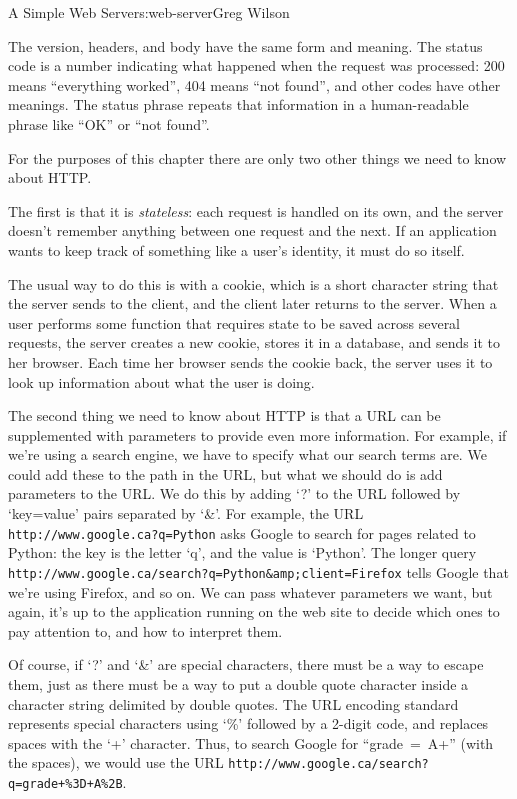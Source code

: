 \begin{aosachapter}{A Simple Web Server}{s:web-server}{Greg Wilson}

The version, headers, and body have the same form and meaning. The
status code is a number indicating what happened when the request was
processed: 200 means ``everything worked'', 404 means ``not found'', and
other codes have other meanings. The status phrase repeats that
information in a human-readable phrase like ``OK'' or ``not found''.

For the purposes of this chapter there are only two other things we need
to know about HTTP.

The first is that it is \emph{stateless}: each request is handled on its
own, and the server doesn't remember anything between one request and
the next. If an application wants to keep track of something like a
user's identity, it must do so itself.

The usual way to do this is with a cookie, which is a short character
string that the server sends to the client, and the client later returns
to the server. When a user performs some function that requires state to
be saved across several requests, the server creates a new cookie,
stores it in a database, and sends it to her browser. Each time her
browser sends the cookie back, the server uses it to look up information
about what the user is doing.

The second thing we need to know about HTTP is that a URL can be
supplemented with parameters to provide even more information. For
example, if we're using a search engine, we have to specify what our
search terms are. We could add these to the path in the URL, but what we
should do is add parameters to the URL. We do this by adding `?' to the
URL followed by `key=value' pairs separated by `\&'. For example, the
URL \texttt{http://www.google.ca?q=Python} asks Google to search for
pages related to Python: the key is the letter `q', and the value is
`Python'. The longer query
\texttt{http://www.google.ca/search?q=Python\&amp;client=Firefox} tells
Google that we're using Firefox, and so on. We can pass whatever
parameters we want, but again, it's up to the application running on the
web site to decide which ones to pay attention to, and how to interpret
them.

Of course, if `?' and `\&' are special characters, there must be a way
to escape them, just as there must be a way to put a double quote
character inside a character string delimited by double quotes. The URL
encoding standard represents special characters using `\%' followed by a
2-digit code, and replaces spaces with the `+' character. Thus, to
search Google for ``grade~=~A+'' (with the spaces), we would use the URL
\texttt{http://www.google.ca/search?q=grade+\%3D+A\%2B}.


\end{aosachapter}
